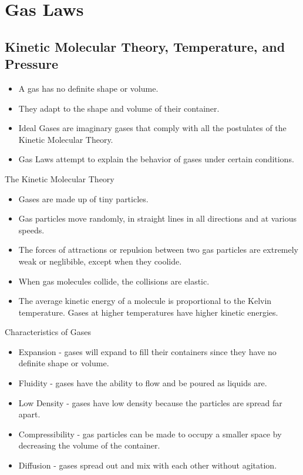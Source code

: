 \documentclass[../hchem.tex]{subfiles}
\begin{document}
\chapter{Gas Laws}
\section{Kinetic Molecular Theory, Temperature, and Pressure}
\begin{itemize}
    \item A gas has no definite shape or volume.
    \item They adapt to the shape and volume of their container.
    \item Ideal Gases are imaginary gases that comply with all the postulates of the Kinetic Molecular Theory.
    \item Gas Laws attempt to explain the behavior of gases under certain conditions.
\end{itemize}

The Kinetic Molecular Theory 
\begin{itemize}
    \item Gases are made up of tiny particles.
    \item Gas particles move randomly, in straight lines in all directions and at various speeds.
    \item The forces of attractions or repulsion between two gas particles are extremely weak or neglibible, except when they coolide.
    \item When gas molecules collide, the collisions are elastic.
    \item The average kinetic energy of a molecule is proportional to the Kelvin temperature. Gases at higher temperatures have higher kinetic energies.
\end{itemize}

Characteristics of Gases
\begin{itemize}
    \item Expansion - gases will expand to fill their containers since they have no definite shape or volume.
    \item Fluidity - gases have the ability to flow and be poured as liquids are.
    \item Low Density - gases have low density because the particles are spread far apart.
    \item Compressibility - gas particles can be made to occupy a smaller space by decreasing the volume of the container.
    \item Diffusion - gases spread out and mix with each other without agitation.
\end{itemize}
\end{document}
